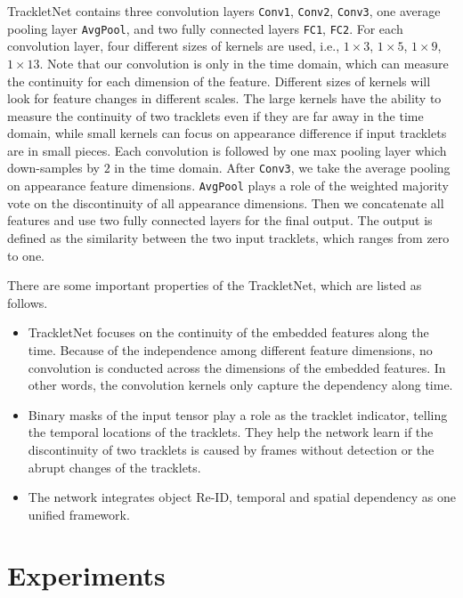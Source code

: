 \documentclass[10pt,twocolumn,letterpaper]{article}
\begin{document}
TrackletNet contains three convolution layers \texttt{Conv1}, \texttt{Conv2}, \texttt{Conv3}, one average pooling layer \texttt{AvgPool}, and two fully connected layers \texttt{FC1}, \texttt{FC2}. 
For each convolution layer, four different sizes of kernels are used, i.e., $1 \times3$, $1 \times 5$, $1 \times 9$, $1 \times 13$. Note that our convolution is only in the time domain, which can measure the continuity for each dimension of the feature. Different sizes of kernels will look for feature changes in different scales. The large kernels have the ability to measure the continuity of two tracklets even if they are far away in the time domain, while small kernels can focus on appearance difference if input tracklets are in small pieces. Each convolution is followed by one max pooling layer which down-samples by $2$ in the time domain. After \texttt{Conv3}, we take the average pooling on appearance feature dimensions. \texttt{AvgPool} plays a role of the weighted majority vote on the discontinuity of all appearance dimensions. Then we concatenate all features and use two fully connected layers for the final output. The output is defined as the similarity between the two input tracklets, which ranges from zero to one. 







There are some important properties of the TrackletNet, which are listed as follows.
\begin{itemize}
\setlength\itemsep{-0.2em}
    \item TrackletNet focuses on the continuity of the embedded features along the time. Because of the independence among different feature dimensions, no convolution is conducted across the dimensions of the embedded features. In other words, the convolution kernels only capture the dependency along time.
    \item Binary masks of the input tensor play a role as the tracklet indicator, telling the temporal locations of the tracklets. They help the network learn if the discontinuity of two tracklets is caused by frames without detection or the abrupt changes of the tracklets. \item The network integrates object Re-ID, temporal and spatial dependency as one unified framework.
\end{itemize}




\section{Experiments}
\label{sec:experiment}
\end{document}
